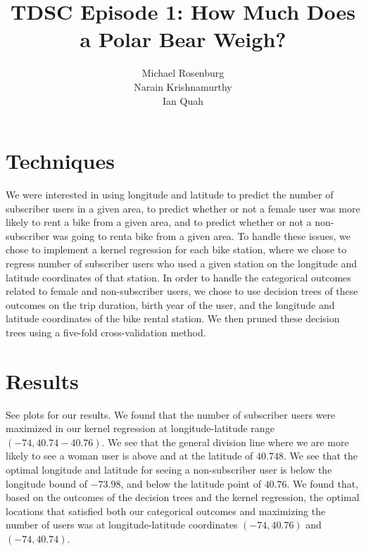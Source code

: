 \documentclass{article}
\title{TDSC Episode 1: How Much Does a Polar Bear Weigh?}
\author{Michael Rosenburg \\ Narain Krishnamurthy \\ Ian Quah}
\begin{document}
\maketitle

\section{Techniques}
We were interested in using longitude and latitude to predict the number of
subscriber users in a given area, to predict whether or not a female user
was more likely to rent a bike from a given area, and to predict whether or
not a non-subscriber was going to renta  bike from a given area. To handle these
issues, we chose to implement a kernel regression for each bike station, where
we chose to regress number of subscriber users who used a given station on the
longitude and latitude coordinates of that station. In order to handle the
categorical outcomes related to female and non-subscriber users, we chose to
use decision trees of these outcomes on the trip duration, birth year of the
user, and the longitude and latitude coordinates of the bike rental station.
We then pruned these decision trees using a five-fold cross-validation method.

\section{Results}
See plots for our results. We found that the number of subscriber users were
maximized in our kernel regression at longitude-latitude range $(-74,40.74
-40.76).$ We see that the general division line where we are more likely to
see a woman user is above and at the latitude of $40.748$. We see that the
optimal longitude and latitude for seeing a non-subscriber user is below
the longitude bound of $-73.98$, and below the latitude point of $40.76$.
We found that, based on the outcomes of the decision
trees and the kernel regression, the optimal locations that satisfied both
our categorical outcomes and maximizing the number of users was at
longitude-latitude coordinates $(-74, 40.76)$ and $(-74, 40.74)$.
\end{document}
